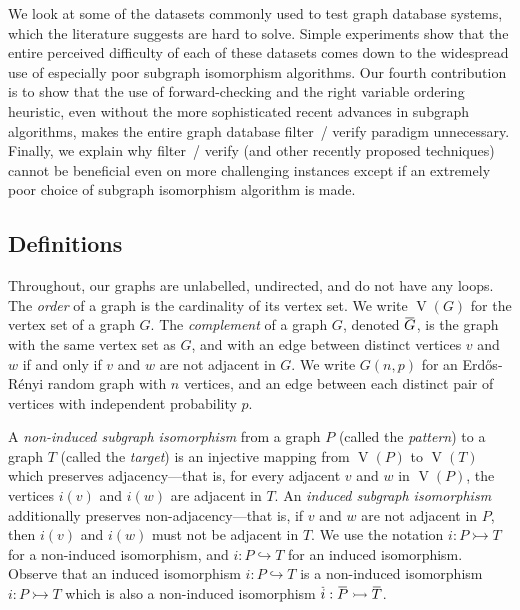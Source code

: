 \documentclass[twoside,11pt]{article}
\newcommand{\shortoverline}[1]{\mkern 1.5mu\overline{\mkern-1.5mu#1\mkern-1.5mu}\mkern 1.5mu}
\begin{document}
We look at some of the datasets commonly used to test graph database systems, which the literature
suggests are hard to solve. Simple experiments show that the entire perceived difficulty
of each of these datasets comes down to the widespread use of especially poor subgraph isomorphism
algorithms. Our fourth contribution is to show that the use of forward-checking and the right
variable ordering heuristic, even without the more sophisticated recent advances in subgraph
algorithms, makes the entire graph database filter~/ verify paradigm unnecessary.  Finally, we
explain why filter~/ verify (and other recently proposed techniques) cannot be beneficial even on
more challenging instances except if an extremely poor choice of subgraph isomorphism algorithm is
made.

\subsection{Definitions}

Throughout, our graphs are unlabelled, undirected, and do not have any loops.  The \emph{order} of a
graph is the cardinality of its vertex set. We write $\operatorname{V}(G)$ for the vertex set of a
graph $G$. The \emph{complement} of a graph $G$, denoted $\shortoverline{G}$, is the graph with the
same vertex set as $G$, and with an edge between distinct vertices $v$ and $w$ if and only if $v$
and $w$ are not adjacent in $G$. We write $G(n, p)$ for an Erd\H{o}s-R\'enyi random graph with $n$
vertices, and an edge between each distinct pair of vertices with independent probability $p$.

A \emph{non-induced subgraph isomorphism} from a graph $P$ (called the \emph{pattern}) to a graph
$T$ (called the \emph{target}) is an injective mapping from $\operatorname{V}(P)$ to
$\operatorname{V}(T)$ which preserves adjacency---that is, for every adjacent $v$ and $w$ in
$\operatorname{V}(P)$, the vertices $i(v)$ and $i(w)$ are adjacent in $T$. An \emph{induced subgraph
isomorphism} additionally preserves non-adjacency---that is, if $v$ and $w$ are not adjacent in $P$,
then $i(v)$ and $i(w)$ must not be adjacent in $T$. We use the notation $i : P \rightarrowtail T$
for a non-induced isomorphism, and $i : P \hookrightarrow T$ for an induced isomorphism. Observe
that an induced isomorphism $i : P \hookrightarrow T$ is a non-induced isomorphism $i : P
\rightarrowtail T$ which is also a non-induced isomorphism $\shortoverline{i} : \shortoverline{P}
\rightarrowtail \shortoverline{T}$.
\end{document}
